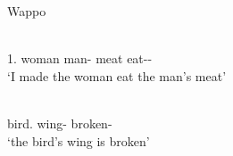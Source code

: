 \begin{exe}\ex\label{WapGen} {Wappo} \citep[14, 15]{Thompsonetal:2006}\nopagebreak[4]
\begin{xlist}
\ex\gll{}      \\
1\sg{}.\nom{} \dem{} woman \dem{} man-\gen{} meat eat-\caus{}-\pst{}\\
`I made the woman eat the man's meat' %

\ex\gll\textbf{}  \\
bird.\acc{} wing-\nom{} broken-\stat{}\\
`the bird's wing is broken'%
\end{xlist}
\end{exe}

%



